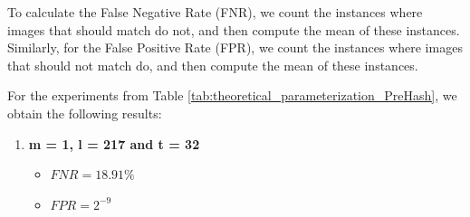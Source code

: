 To calculate the False Negative Rate (FNR), we count the instances where images that should match do not, and then compute the mean of these instances. Similarly, for the False Positive Rate (FPR), we count the instances where images that should not match do, and then compute the mean of these instances.

For the experiments from Table \ref{tab:theoretical_parameterization_PreHash}, we obtain the following results:

\begin{enumerate}
    \item \textbf{m = 1, l = 217 and t = 32}
        \begin{itemize}
            \item $FNR = 18.91\%$
            \item $FPR = 2^{-9}$


\end{itemize}
\end{enumerate}
